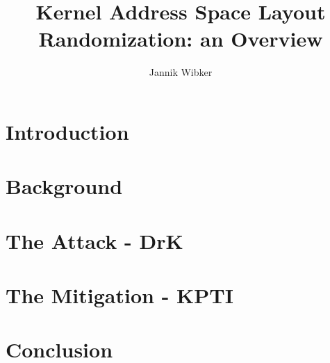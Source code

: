 \documentclass[10pt,twocolumn,a4paper]{article}
\author{Jannik Wibker}
\begin{document}
\title{ Kernel Address Space Layout Randomization: an Overview }

\newcommand{\todo}[1]{{\texttt{[#1]}}}
\newcommand{\code}[1]{{\tt \small{#1}}}

\maketitle

\begin{abstract}

\end{abstract}

\section{Introduction}\label{sec:introduction}



\section{Background}\label{sec:background}



\section{The Attack - DrK}\label{sec:drk}



\section{The Mitigation - KPTI}\label{sec:kpti}



\section{Conclusion}\label{sec:conclusion}





\end{document}

